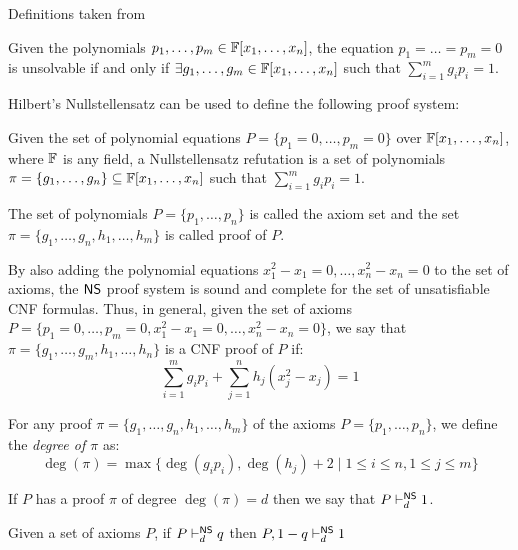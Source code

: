 Definitions taken from \cite{Nullstellensatz}

\begin{definition}
    Given the polynomials $p_1, \ldots, p_m \in \mathbb{F}[x_1, \ldots, x_n]$, the equation $p_1 = \ldots = p_m = 0$ is unsolvable if and only if $\exists g_1, \ldots, g_m \in \mathbb{F}[x_1, \ldots, x_n]$ such that $\sum\limits_{i = 1}^m g_i p_i = 1$.
\end{definition}

Hilbert's Nullstellensatz can be used to define the following proof system:

\begin{definition}
    Given the set of polynomial equations $P = \{p_1 = 0, \ldots, p_m = 0\}$ over $\mathbb{F}[x_1, \ldots, x_n]$, where $\mathbb{F}$ is any field, a Nullstellensatz refutation is a set of polynomials $\pi = \{g_1, \ldots, g_n\} \subseteq \mathbb{F}[x_1, \ldots, x_n]$ such that $\sum\limits_{i = 1}^m g_i p_i = 1$.

    The set of polynomials $P = \{p_1, \ldots, p_n\}$ is called the axiom set and the set $\pi = \{g_1, \ldots, g_n, h_1, \ldots, h_m\}$ is called proof of $P$.
\end{definition}

By also adding the polynomial equations $x_1^2-x_1 = 0, \ldots, x_n^2-x_n = 0$ to the set of axioms, the $\mathsf{NS}$ proof system is sound and complete for the set of unsatisfiable CNF formulas. Thus, in general, given the set of axioms $P = \{p_1 = 0, \ldots, p_m = 0, x_1^2-x_1 = 0, \ldots, x_n^2-x_n = 0\}$, we say that $\pi = \{g_1, \ldots, g_m, h_1, \ldots, h_n\}$ is a CNF proof of $P$ if:
\[\sum_{i = 1}^m g_i p_i + \sum_{j = 1}^n h_j (x_j^2-x_j) = 1\]

For any proof $\pi = \{g_1, \ldots, g_n, h_1, \ldots, h_m\}$ of the axioms $P = \{p_1, \ldots, p_n\}$, we define the \textit{degree of $\pi$} as:
\[\deg(\pi) = \max\{\deg(g_i p_i), \deg(h_j) + 2 \mid 1 \leq i \leq n, 1 \leq j \leq m\}\]

If $P$ has a proof $\pi$ of degree $\deg(\pi) = d$ then we say that $P \vdash^{\mathsf{NS}}_d 1$.

\begin{proposition}
    \label{neg_refutation}
    Given a set of axioms $P$, if $P \vdash^{\mathsf{NS}}_d q$ then $P, 1-q \vdash^{\mathsf{NS}}_d 1$ 
\end{proposition}

